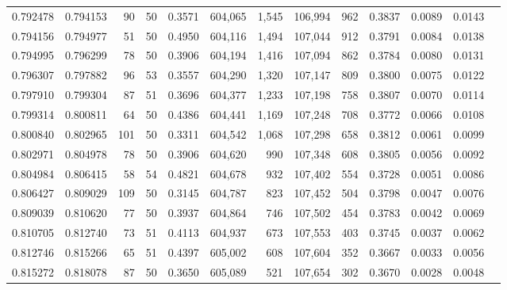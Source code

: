 \begin{tabular}{rrrrrrrrrrrrr}
0.792478 & 0.794153 &    90 &  50 &                                     0.3571 & 604,065 &   1,545 & 106,994 &     962 & 0.3837 & 0.0089 & 0.0143 \\
0.794156 & 0.794977 &    51 &  50 &                                     0.4950 & 604,116 &   1,494 & 107,044 &     912 & 0.3791 & 0.0084 & 0.0138 \\
0.794995 & 0.796299 &    78 &  50 &                                     0.3906 & 604,194 &   1,416 & 107,094 &     862 & 0.3784 & 0.0080 & 0.0131 \\
0.796307 & 0.797882 &    96 &  53 &                                     0.3557 & 604,290 &   1,320 & 107,147 &     809 & 0.3800 & 0.0075 & 0.0122 \\
0.797910 & 0.799304 &    87 &  51 &                                     0.3696 & 604,377 &   1,233 & 107,198 &     758 & 0.3807 & 0.0070 & 0.0114 \\
0.799314 & 0.800811 &    64 &  50 &                                     0.4386 & 604,441 &   1,169 & 107,248 &     708 & 0.3772 & 0.0066 & 0.0108 \\
0.800840 & 0.802965 &   101 &  50 &                                     0.3311 & 604,542 &   1,068 & 107,298 &     658 & 0.3812 & 0.0061 & 0.0099 \\
0.802971 & 0.804978 &    78 &  50 &                                     0.3906 & 604,620 &     990 & 107,348 &     608 & 0.3805 & 0.0056 & 0.0092 \\
0.804984 & 0.806415 &    58 &  54 &                                     0.4821 & 604,678 &     932 & 107,402 &     554 & 0.3728 & 0.0051 & 0.0086 \\
0.806427 & 0.809029 &   109 &  50 &                                     0.3145 & 604,787 &     823 & 107,452 &     504 & 0.3798 & 0.0047 & 0.0076 \\
0.809039 & 0.810620 &    77 &  50 &                                     0.3937 & 604,864 &     746 & 107,502 &     454 & 0.3783 & 0.0042 & 0.0069 \\
0.810705 & 0.812740 &    73 &  51 &                                     0.4113 & 604,937 &     673 & 107,553 &     403 & 0.3745 & 0.0037 & 0.0062 \\
0.812746 & 0.815266 &    65 &  51 &                                     0.4397 & 605,002 &     608 & 107,604 &     352 & 0.3667 & 0.0033 & 0.0056 \\
0.815272 & 0.818078 &    87 &  50 &                                     0.3650 & 605,089 &     521 & 107,654 &     302 & 0.3670 & 0.0028 & 0.0048 \\

\end{tabular}
